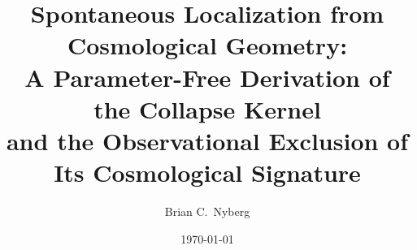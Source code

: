 \documentclass[aps,prd,twocolumn,superscriptaddress,nofootinbib]{revtex4-2}
\theoremstyle{definition}
\theoremstyle{remark}
\begin{document}

\title{Spontaneous Localization from Cosmological Geometry:\\
A Parameter-Free Derivation of the Collapse Kernel\\
and the Observational Exclusion of Its Cosmological Signature}

\author{Brian C.\ Nyberg}

\date{\today}

\end{document}
